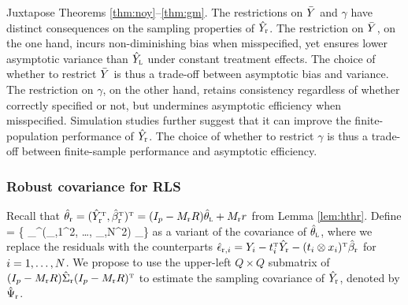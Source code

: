 \documentclass[11pt]{article}
\theoremstyle{definition}
\begin{document}
Juxtapose Theorems \ref{thm:noy}--\ref{thm:gm}. The restrictions on $\bar Y$ and $\gamma$ have distinct consequences on the sampling properties of $\hat Y_{\textup{r}}$. 
The restriction on $\bar Y$, on the one hand, incurs non-diminishing bias when misspecified, yet %
ensures lower asymptotic variance than $\hat Y_{\textsc{l}}$ under constant treatment effects.
The choice of whether to restrict $\bar Y$ is thus a trade-off between asymptotic bias and variance. 
The restriction on $\gamma$, on the other hand,  retains consistency regardless of whether correctly specified or not, but undermines asymptotic efficiency when misspecified. 
Simulation studies further suggest that it can improve the finite-population performance of $\hat Y_{\textup{r}}$. 
The choice of whether to restrict $\gamma$ is thus a trade-off between finite-sample performance and asymptotic efficiency. 


 


\subsubsection{Robust covariance for RLS}\label{sec:ehw_rols}

Recall that $\hat\theta_{{\textup{r}} }   = (\hat Y_{\textup{r}}^{ \mathrm{\scriptscriptstyle T} }, \hat\beta_{\textup{r}}^{ \mathrm{\scriptscriptstyle T} })^{ \mathrm{\scriptscriptstyle T} }
= (I_p-M_{\textup{r}} R) \hat\theta_{\textsc{l}} + M_{\textup{r}} r$ from Lemma \ref{lem:hthr}. 
Define
\begina
\hsigr  =  \ccinvl  \{ \chi_\lin ^\T  \diag(\hat\epsilon_{\lr,1}^2, \dots, \hat\epsilon_{\lr,N}^2) \chi_\lin \}\ccinvl
\enda 
as a variant of the \ehws covariance of $\hat\theta_{\textsc{l}}$, 
where we replace the \olss residuals with the \rolss counterparts $\hat{\epsilon}_{{\textup{r}} ,i} = Y_i - t_i^{ \mathrm{\scriptscriptstyle T} } \hat Y_{\textup{r}} - (t_i \otimes x_i)^{ \mathrm{\scriptscriptstyle T} } \hat\beta_{\textup{r}}$ for $i = 1, \ldots,N$. 
We propose to use the upper-left $Q \times Q$ submatrix of 
$
(I_p-M_{\textup{r}} R ) \hat\Sigma_{\textup{r}}  (I_p-M_{\textup{r}} R )^{ \mathrm{\scriptscriptstyle T} }
$ to estimate the sampling covariance of $\hat Y_{\textup{r}}$, denoted by $\hat\Psi_{\textup{r}}$. 

%
%
\end{document}
